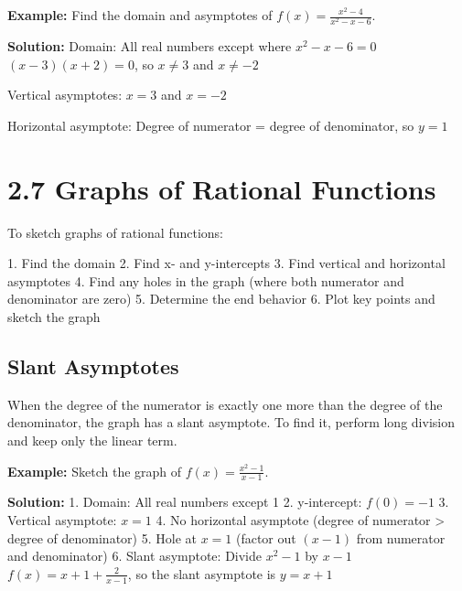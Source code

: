 \documentclass[12pt]{article}
\begin{document}
\textbf{Example:} Find the domain and asymptotes of $f(x) = \frac{x^2 - 4}{x^2 - x - 6}$.

\textbf{Solution:}
Domain: All real numbers except where $x^2 - x - 6 = 0$
$(x - 3)(x + 2) = 0$, so $x \neq 3$ and $x \neq -2$

Vertical asymptotes: $x = 3$ and $x = -2$

Horizontal asymptote: Degree of numerator = degree of denominator, so $y = 1$

\section{2.7 Graphs of Rational Functions}

To sketch graphs of rational functions:

1. Find the domain
2. Find x- and y-intercepts
3. Find vertical and horizontal asymptotes
4. Find any holes in the graph (where both numerator and denominator are zero)
5. Determine the end behavior
6. Plot key points and sketch the graph

\subsection{Slant Asymptotes}

When the degree of the numerator is exactly one more than the degree of the denominator, the graph has a slant asymptote. To find it, perform long division and keep only the linear term.

\textbf{Example:} Sketch the graph of $f(x) = \frac{x^2 - 1}{x - 1}$.

\textbf{Solution:}
1. Domain: All real numbers except 1
2. y-intercept: $f(0) = -1$
3. Vertical asymptote: $x = 1$
4. No horizontal asymptote (degree of numerator > degree of denominator)
5. Hole at $x = 1$ (factor out $(x-1)$ from numerator and denominator)
6. Slant asymptote: Divide $x^2 - 1$ by $x - 1$
   $f(x) = x + 1 + \frac{2}{x-1}$, so the slant asymptote is $y = x + 1$

   \begin{center}
\end{center}
\end{document}
